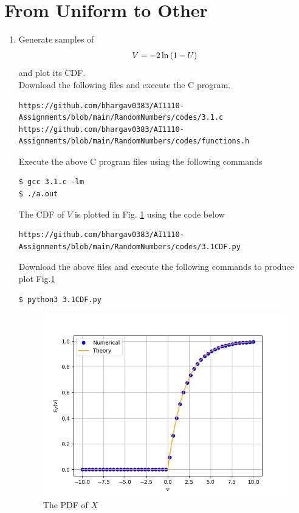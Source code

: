 \documentclass[journal,12pt,twocolumn]{IEEEtran}
\begin{document}
\section{From Uniform to Other}
\begin{enumerate}[label=\thesection.\arabic*
,ref=\thesection.\theenumi]
%
\item
Generate samples of 
%
\begin{equation}
V = -2\ln\left(1-U\right)
\end{equation}
%
and plot its CDF.  \\
\solution Download the following files and execute the  C program.
\begin{lstlisting}
https://github.com/bhargav0383/AI1110-Assignments/blob/main/RandomNumbers/codes/3.1.c
https://github.com/bhargav0383/AI1110-Assignments/blob/main/RandomNumbers/codes/functions.h
\end{lstlisting}
Execute the above C program files using the following commands
\begin{lstlisting}
$ gcc 3.1.c -lm
$ ./a.out
\end{lstlisting}
The CDF of $V$ is plotted in Fig. \ref{fig:3.1} using the code below
\begin{lstlisting}
https://github.com/bhargav0383/AI1110-Assignments/blob/main/RandomNumbers/codes/3.1CDF.py
\end{lstlisting}
Download the above files and execute the following commands to produce plot Fig.\ref{fig:3.1}
\begin{lstlisting}
$ python3 3.1CDF.py
\end{lstlisting}
\begin{figure}[!h]
\centering
\includegraphics[width=\columnwidth]{./figs/3.1CDF.png}
\caption{The PDF of $X$}
\label{fig:3.1}
\end{figure}


\end{enumerate}
\end{document}
